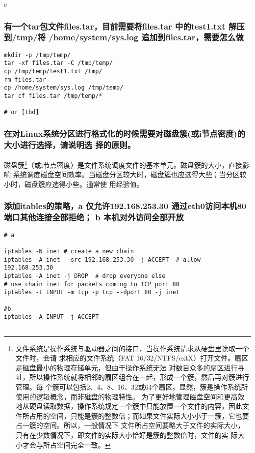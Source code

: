 \documentclass{article}
\begin{document}
\begin{mitned}{c}
\subsubsection{有一个tar包文件files.tar，目前需要将files.tar 中的test1.txt 解压到/tmp/将 /home/system/sys.log 追加到files.tar，需要怎么做}
\begin{verbatim}
mkdir -p /tmp/temp/
tar -xf files.tar -C /tmp/temp/
cp /tmp/temp/test1.txt /tmp/
rm files.tar
cp /home/system/sys.log /tmp/temp/
tar cf files.tar /tmp/temp/*

# or [tbd]

\end{verbatim}

\subsubsection{在对Linux系统分区进行格式化的时候需要对磁盘簇(或i节点密度)的大小进行选择，请说明选
择的原则。}
磁盘簇\footnote{ 文件系统是操作系统与驱动器之间的接口，当操作系统请求从硬盘里读取一个文件时，会请
求相应的文件系统（FAT 16/32/NTFS/extX）打开文件。扇区是磁盘最小的物理存储单元，但由于操作系统无法
对数目众多的扇区进行寻址，所以操作系统就将相邻的扇区组合在一起，形成一个簇，然后再对簇进行管理。每
个簇可以包括2、4、8、16、32或64个扇区。显然，簇是操作系统所使用的逻辑概念，而非磁盘的物理特性。
为了更好地管理磁盘空间和更高效地从硬盘读取数据，操作系统规定一个簇中只能放置一个文件的内容，因此文
件所占用的空间，只能是簇的整数倍；而如果文件实际大小小于一簇，它也要占一簇的空间。所以，一般情况下
文件所占空间要略大于文件的实际大小，只有在少数情况下，即文件的实际大小恰好是簇的整数倍时，文件的实
际大小才会与所占空间完全一致。}（或i节点密度）是文件系统调度文件的基本单元。磁盘簇的大小，直接影响
系统调度磁盘空间效率。当磁盘分区较大时，磁盘簇也应选得大些；当分区较小时，磁盘簇应选得小些。通常使
用经验值。

\subsubsection{添加itables的策略，a 仅允许192.168.253.30 通过eth0访问本机80端口其他连接全部拒绝；
b 本机对外访问全部开放}
\begin{verbatim}
# a

iptables -N inet # create a new chain
iptables -A inet --src 192.168.253.30 -j ACCEPT  # allow 192.168.253.30
iptables -A inet -j DROP  # drop everyone else
# use chain inet for packets coming to TCP port 80
iptables -I INPUT -m tcp -p tcp --dport 80 -j inet  

#b 
iptables -A INPUT -j ACCEPT


\end{verbatim}
\end{mitned}
\end{document}
